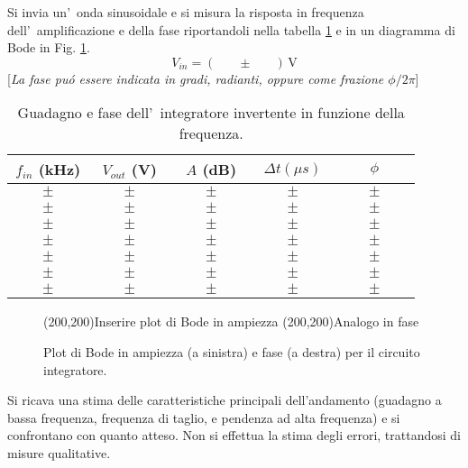 \documentclass[10pt,a4paper]{article}
\newcommand{\rem}[1]{[\emph{#1}]}
\newcommand{\exn}{\phantom{xxx}}
\begin{document}
Si invia un'~onda sinusoidale e si misura la risposta in frequenza dell'~amplificazione e della fase riportandoli 
nella tabella \ref{tab:bodeinte} e in un diagramma di Bode in Fig. \ref{fig:bodeinte}. 
\[
V_{in} = (\exn \pm \exn )\,\mathrm{V}
\]
\rem{La fase pu\'o essere indicata in gradi, radianti, oppure come frazione $\phi/2\pi$}
%
\begin{table}[h]
\caption{Guadagno e fase dell'~integratore invertente in funzione della frequenza.}
\label{tab:bodeinte}
\begin{center}
\begin{tabular}{|c|c|c|c|c|}
\hline
$f_{in}$ (kHz) & $V_{out}$ (V) & $A$ (dB) & $\Delta t (\mu s)$ & $\phi$ \\
\hline
$\exn \pm \exn $ & $\exn \pm \exn $ & $\exn \pm \exn $ & $\exn \pm \exn $ & $\exn \pm \exn $ \\
\hline
$\exn \pm \exn $ & $\exn \pm \exn $ & $\exn \pm \exn $ & $\exn \pm \exn $ & $\exn \pm \exn $ \\
\hline
$\exn \pm \exn $ & $\exn \pm \exn $ & $\exn \pm \exn $ & $\exn \pm \exn $ & $\exn \pm \exn $ \\
\hline
$\exn \pm \exn $ & $\exn \pm \exn $ & $\exn \pm \exn $ & $\exn \pm \exn $ & $\exn \pm \exn $ \\
\hline
$\exn \pm \exn $ & $\exn \pm \exn $ & $\exn \pm \exn $ & $\exn \pm \exn $ & $\exn \pm \exn $ \\
\hline
$\exn \pm \exn $ & $\exn \pm \exn $ & $\exn \pm \exn $ & $\exn \pm \exn $ & $\exn \pm \exn $ \\
\hline
$\exn \pm \exn $ & $\exn \pm \exn $ & $\exn \pm \exn $ & $\exn \pm \exn $ & $\exn \pm \exn $ \\
\hline
\end{tabular}
\end{center}
\end{table} 
%
\begin{figure}[htb]
\begin{center}
\framebox(200,200){Inserire plot di Bode in ampiezza}
\framebox(200,200){Analogo in fase}
\end{center}
\caption{\small Plot di Bode in ampiezza (a sinistra) e fase (a destra) per il circuito integratore.}
\label{fig:bodeinte}
\end{figure}
%

Si ricava una stima delle caratteristiche principali dell'andamento (guadagno a bassa frequenza, frequenza di taglio, e pendenza ad alta frequenza)
e si confrontano con quanto atteso. Non si effettua la stima degli errori, trattandosi di misure qualitative.
\end{document}
